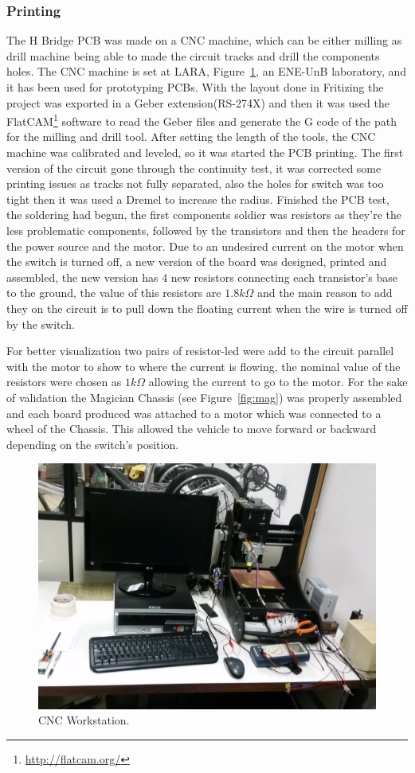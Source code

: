     \subsubsection{Printing} %
    \label{ssub:printing}
        The H Bridge PCB was made on a CNC machine, which can be either milling as drill machine being able to made the circuit tracks and drill the components holes. The CNC machine is set at LARA, Figure~\ref{fig:workstation}, an ENE-UnB laboratory, and it has been used for prototyping PCBs. With the layout done in Fritizing the project was exported in a Geber extension(RS-274X) and then it was used the FlatCAM\footnote{\url{http://flatcam.org/}} software to read the Geber files and generate the G code of the path for the milling and drill tool. After setting the length of the tools, the CNC machine was calibrated and leveled, so it was started the PCB printing. The first version of the circuit gone through the continuity test, it was corrected some printing issues as tracks not fully separated, also the holes for switch was too tight then it was used a Dremel to increase the radius. Finished the PCB test, the soldering had begun, the first components soldier was resistors as they're the less problematic components, followed by the transistors and then the headers for the power source and the motor. Due to an undesired current on the motor when the switch is turned off, a new version of the board was designed, printed and assembled, the new version has 4 new resistors connecting each transistor's base to the ground, the value of this resistors are $1.8k\Omega$ and the main reason to add they on the circuit is to pull down the floating current when the wire is turned off by the switch.
	
    For better visualization two pairs of resistor-led were add to the circuit parallel with the motor to show to where the current is flowing, the nominal value of the resistors were chosen as $1k\Omega$ allowing the current to go to the motor.
	For the sake of validation the Magician Chassis (see Figure~\ref{fig:mag}) was properly assembled and each board produced was attached to a motor which was connected to a wheel of the Chassis. This allowed the vehicle to move forward or backward depending on the switch's position.

\begin{figure}
\centering
\centering%
\includegraphics[height=.35\textwidth]{img/workstation_cnc.jpg}
\caption{CNC Workstation.}
\label{fig:workstation}%
\end{figure}

